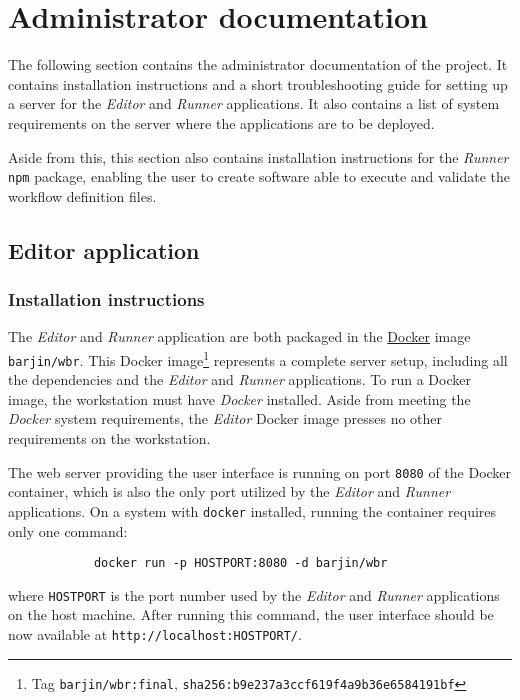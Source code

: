 
\section{Administrator documentation} \label{adminDocs}

The following section contains the administrator documentation of the project.
It contains installation instructions and a short troubleshooting guide for setting up a server for the \textit{Editor} and \textit{Runner} applications. 
It also contains a list of system requirements on the server where the applications are to be deployed.

Aside from this, this section also contains installation instructions for the \textit{Runner} \texttt{npm} package, enabling the user to create software able to execute and validate the workflow definition files.

\subsection{Editor application}

\subsubsection{Installation instructions}

The \textit{Editor} and \textit{Runner} application are both packaged in the \href{https://www.docker.com/}{Docker} image \texttt{barjin/wbr}.
This Docker image\footnote{Tag \texttt{barjin/wbr:final}, \texttt{sha256:b9e237a3ccf619f4a9b36e6584191bf}} represents a complete server setup, including all the dependencies and the \textit{Editor} and \textit{Runner} applications.
To run a Docker image, the workstation must have \textit{Docker} installed. 
Aside from meeting the \textit{Docker} system requirements, the \textit{Editor} Docker image presses no other requirements on the workstation.

The web server providing the user interface is running on port \texttt{8080} of the Docker container, which is also the only port utilized by the \textit{Editor} and \textit{Runner} applications.
On a system with \texttt{docker} installed, running the container requires only one command:

\begin{verbatim}
            docker run -p HOSTPORT:8080 -d barjin/wbr
\end{verbatim}
where \texttt{HOSTPORT} is the port number used by the \textit{Editor} and \textit{Runner} applications on the host machine.
After running this command, the user interface should be now available at \texttt{http://localhost:HOSTPORT/}.

